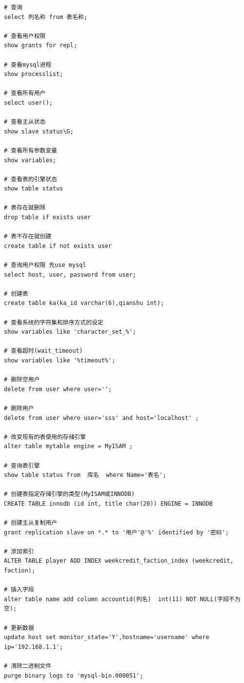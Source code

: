 \small{
\begin{verbatim}
# 查询
select 列名称 from 表名称;    

# 查看用户权限
show grants for repl;         

# 查看mysql进程
show processlist;             

# 查看所有用户
select user();                

# 查看主从状态
show slave status\G;          

# 查看所有参数变量
show variables; 

# 查看表的引擎状态
show table status             

# 表存在就删除
drop table if exists user                       

# 表不存在就创建
create table if not exists user                 

# 查询用户权限 先use mysql
select host, user, password from user;          

# 创建表
create table ka(ka_id varchar(6),qianshu int);  

# 查看系统的字符集和排序方式的设定
show variables like 'character_set_%';          

# 查看超时(wait_timeout)
show variables like '%timeout%';                

# 删除空用户
delete from user where user='';                 

# 删除用户
delete from user where user='sss' and host='localhost' ;    

# 改变现有的表使用的存储引擎
alter table mytable engine = MyISAM ;                       

# 查询表引擎
show table status from  库名  where Name='表名';            

# 创建表指定存储引擎的类型(MyISAM或INNODB)
CREATE TABLE innodb (id int, title char(20)) ENGINE = INNODB                     

# 创建主从复制用户
grant replication slave on *.* to '用户'@'%' identified by '密码';               

# 添加索引
ALTER TABLE player ADD INDEX weekcredit_faction_index (weekcredit, faction);     

# 插入字段
alter table name add column accountid(列名)  int(11) NOT NULL(字段不为空);       

# 更新数据
update host set monitor_state='Y',hostname='username' where ip='192.168.1.1';     

# 清除二进制文件
purge binary logs to 'mysql-bin.000051';
\end{verbatim}
}
\normalsize


